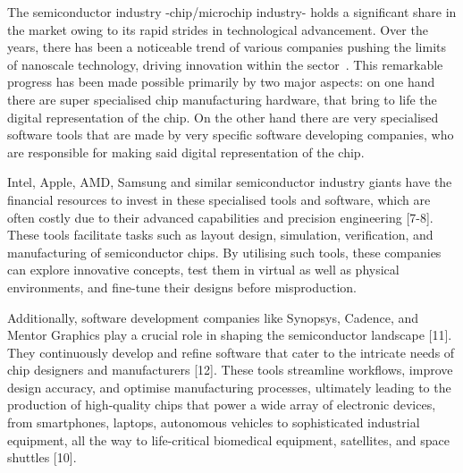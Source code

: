 The semiconductor industry -chip/microchip industry- holds a significant share in the market owing to its rapid strides in technological advancement. Over the years, there has been a noticeable trend of various companies pushing the limits of nanoscale technology, driving innovation within the sector\ \cite{IRDS2020}. This remarkable progress has been made possible primarily by two major aspects: on one hand there are  super specialised chip manufacturing hardware, that bring to life the digital representation of the chip. On the other hand there are very specialised software tools that are made by very specific software developing companies, who are responsible for making said digital representation of the chip. 

Intel, Apple, AMD, Samsung and similar semiconductor industry giants have the financial resources to invest in these specialised tools and software, which are often costly due to their advanced capabilities and precision engineering [7-8]. These tools facilitate tasks such as layout design, simulation, verification, and manufacturing of semiconductor chips. By utilising such tools, these companies can explore innovative concepts, test them in virtual as well as physical environments, and fine-tune their designs before misproduction.

Additionally, software development companies like Synopsys, Cadence, and Mentor Graphics play a crucial role in shaping the semiconductor landscape [11]. They continuously develop and refine software that cater to the intricate needs of chip designers and manufacturers [12]. These tools streamline workflows, improve design accuracy, and optimise manufacturing processes, ultimately leading to the production of high-quality chips that power a wide array of electronic devices, from smartphones, laptops, autonomous vehicles to sophisticated industrial equipment, all the way to life-critical biomedical equipment, satellites, and space shuttles [10]. 

